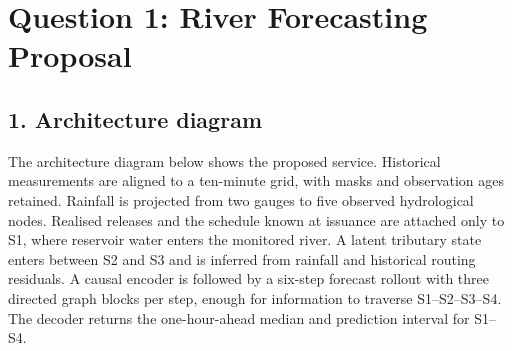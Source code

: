 \documentclass{article}
\begin{document}
\section*{Question 1: River Forecasting Proposal}
\label{sec:q1}

\subsection*{1. Architecture diagram}

The architecture diagram below shows the proposed service. Historical measurements are aligned to a ten-minute grid, with masks and observation ages retained. Rainfall is projected from two gauges to five observed hydrological nodes. Realised releases and the schedule known at issuance are attached only to S1, where reservoir water enters the monitored river. A latent tributary state enters between S2 and S3 and is inferred from rainfall and historical routing residuals. A causal encoder is followed by a six-step forecast rollout with three directed graph blocks per step, enough for information to traverse S1--S2--S3--S4. The decoder returns the one-hour-ahead median and prediction interval for S1--S4.
\end{document}
